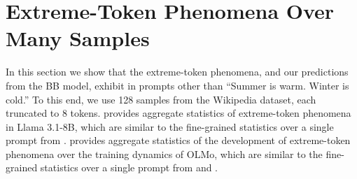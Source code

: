\section{Extreme-Token Phenomena Over Many Samples}\label{sec:many_samples}
In this section we show that the extreme-token phenomena, and our predictions from the BB model, exhibit in prompts other than ``Summer is warm. Winter is cold.'' To this end, we use 128 samples from the Wikipedia dataset, each truncated to 8 tokens.  provides aggregate statistics of extreme-token phenomena in Llama 3.1-8B, which are similar to the fine-grained statistics over a single prompt from .  provides aggregate statistics of the development of extreme-token phenomena over the training dynamics of OLMo, which are similar to the fine-grained statistics over a single prompt from  and .


